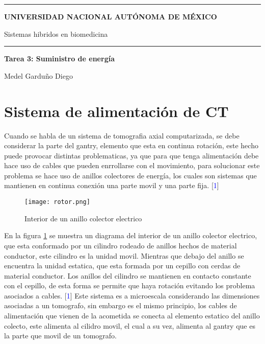 \documentclass{article}
\begin{document}
\thispagestyle{plain}


\hrule
\begin{center}
    {\Large \textbf{UNIVERSIDAD NACIONAL AUTÓNOMA DE MÉXICO}}
    \vspace{10pt}

    {\Large{{Sistemas hibridos en biomedicina}}}
    
    
    \vspace{10pt}

    \hrule

    \vspace{20pt}


    {\Huge \textbf{Tarea 3: Suministro de energía}}\\
\end{center}

\hdashrule{\linewidth}{1pt}{1mm}

\begin{flushright}
    {\small Medel Garduño Diego} 
\end{flushright}

\section{Sistema de alimentación de CT}


Cuando se habla de un sistema de tomografia axial computarizada, se debe considerar la parte del gantry, elemento que esta en continua rotación, este hecho puede provocar distintas problematicas, ya que para que tenga alimentación debe hace uso de cables que pueden enrrollarse con el movimiento, para solucionar este problema se hace uso de anillos colectores de energía, los cuales son sistemas que mantienen en continua conexión una parte movil y una parte fija. [\textcolor{blue}{1}]


\vspace{10pt}

\begin{figure}[h!]
    \centering
    \texttt{[image: rotor.png]}
    \caption{Interior de un anillo colector electrico}
    \label{t1}
\end{figure}


\vspace{10pt}

En la figura \ref{t1} se muestra un diagrama del interior de un anillo colector electrico, que esta conformado por un cilindro rodeado de anillos hechos de material conductor, este cilindro es la unidad movil. Mientras que debajo del anillo se encuentra la unidad estatica, que esta formada por un cepillo con cerdas de material conductor. Los anillos del cilindro se mantienen en contacto constante con el cepillo, de esta forma se permite que haya rotación evitando los problema asociados a cables. [\textcolor{blue}{1}]
Este sistema es a microescala considerando las dimensiones asociadas a un tomografo, sin embargo es el mismo principio, los cables de alimentación que vienen de la acometida se conecta al elemento estatico del anillo colecto, este alimenta al cilidro movil, el cual a su vez, alimenta al gantry que es la parte que movil de un tomografo. 
\end{document}
